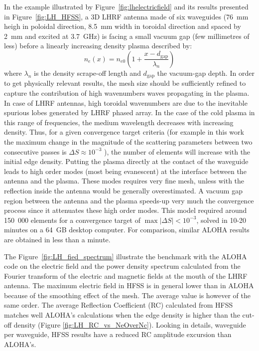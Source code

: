 In the example illustrated by Figure~\ref{fig:lhelectricfield} and its results presented in Figure~\ref{fig:LH_HFSS}, a 3D LHRF antenna made of six waveguides (76~mm heigh in poloidal direction, 8.5~mm width in toroidal direction and spaced by 2~mm and excited at 3.7~GHz) is facing a small vacuum gap (few millimetres of less) before a linearly increasing density plasma described by:
\begin{equation}
	n_e(x)=n_{e0} \left(1+ \frac{x-d_\mathrm{gap}}{\lambda_n} \right)
\end{equation} 
where $\lambda_n$ is the density scrape-off length and $d_\mathrm{gap}$ the vacuum-gap depth. In order to get physically relevant results, the mesh size should be sufficiently refined to capture  the contribution of high wavenumbers waves propagating in the plasma. In case of LHRF antennas, high toroidal wavenumbers are due to the inevitable spurious lobes generated by LHRF phased array. In the case of the cold plasma in this range of frequencies, the medium wavelength decreases with increasing density. Thus, for a given convergence target criteria (for example in this work the maximum change in the magnitude of the scattering parameters between two consecutive passes is $\Delta S\approx 10^{-3}$ ), the number of elements will increase with the initial edge density. Putting the plasma directly at the contact of the waveguide leads to high order modes (most being evanescent) at the interface between the antenna and the plasma. These modes requires very fine mesh, unless with the reflection inside the antenna would be generally overestimated. A vacuum gap region between the antenna and the plasma speeds-up very much the convergence process since it attenuates these high order modes. This model required around 150~000 elements for a convergence target of $\max|\Delta S|<10^{-3}$, solved in 10-20 minutes on a 64~GB desktop computer. For comparison, similar ALOHA results are obtained in less than a minute. 

The Figure~\ref{fig:LH_fied_spectrum} illustrate the benchmark with the ALOHA code on the electric field and the power density spectrum calculated from the Fourier transform of the electric and magnetic fields at the mouth of the LHRF antenna. The maximum electric field in HFSS is in general lower than in ALOHA because of the smoothing effect of the mesh. The average value is however of the same order. The average Reflection Coefficient (RC) calculated from HFSS matches well ALOHA's calculations when the edge density is higher than the cut-off density (Figure \ref{fig:LH_RC_vs_NeOverNc}). Looking in details, waveguide per waveguide, HFSS results have a reduced RC amplitude  excursion than ALOHA's.  


